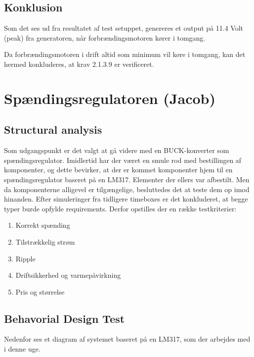 \subsection{Konklusion}
\label{sec:konklusion}

Som det ses ud fra resultatet af test setuppet, genereres et output på 11.4 Volt (peak) fra generatoren, når forbrændingsmotoren kører i tomgang. 

Da forbrændingsmotoren i drift altid som minimum vil køre i tomgang, kan det hermed konkluderes, at krav 2.1.3.9 er verificeret. 
\clearpage
\section{Spændingsregulatoren (Jacob)}
\label{sec:spandingsregulatoren}

\subsection{Structural analysis}
\label{sec:structural-analysis}

Som udgangspunkt er det valgt at gå videre med en BUCK-konverter som spændingsregulator. Imidlertid har der været en smule rod med bestillingen af komponenter, og dette bevirker, at der er kommet komponenter hjem til en spændingsregulator baseret på en LM317. Elementer der ellers var afbestilt. Men da komponenterne alligevel er tilgængelige, besluttedes det at teste dem op imod hinanden. Efter simuleringer fra tidligere timeboxes er det konkluderet, at begge typer burde opfylde requirements. Derfor opstilles der en række testkriterier:

\begin{enumerate}
\item Korrekt spænding
\item Tilstrækkelig strøm
\item Ripple
\item Driftsikkerhed og varmepåvirkning 
\item Pris og størrelse
\end{enumerate}

\subsection{Behavorial Design Test}
\label{sec:behav-design-test}

Nedenfor ses et diagram af systemet baseret på en LM317, som der arbejdes med i denne uge.

